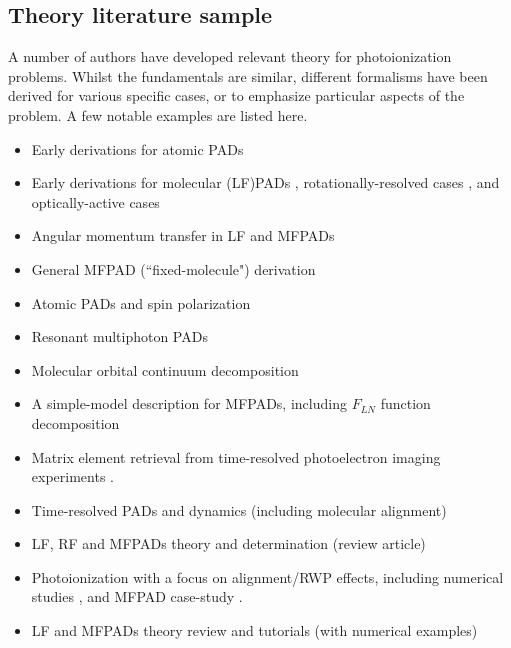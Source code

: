\subsection{Theory literature sample\label{sec:theory-lit}}

A number of authors have developed relevant theory for photoionization problems. Whilst the fundamentals are similar, different formalisms have been derived for various specific cases, or to emphasize particular aspects of the problem. A few notable examples are listed here.

\begin{itemize}
\item Early derivations for atomic PADs \cite{Cherepkov1979,Cooper1968,Cooper1969}
\item Early derivations for molecular (LF)PADs \cite{Tully1968}, rotationally-resolved cases \cite{Buckingham1970}, and optically-active cases \cite{Ritchie1976}
\item Angular momentum transfer in LF and MFPADs \cite{Fano1972} 
\item General MFPAD (``fixed-molecule") derivation \cite{Dill1976}
\item Atomic PADs and spin polarization \cite{Klar1982}
\item Resonant multiphoton PADs \cite{Dixit1983}
\item Molecular orbital continuum decomposition \cite{Park1996}
\item A simple-model description for MFPADs, including $F_{LN}$ function decomposition \cite{Lucchese2004}
\item Matrix element retrieval from time-resolved photoelectron imaging experiments \cite{Suzuki2007}.
\item Time-resolved PADs and dynamics (including molecular alignment) \cite{Underwood2000,Seideman2001,Stolow2008}
\item LF, RF and MFPADs theory and determination (review article) \cite{dowek2012PhotoionizationDynamicsPhotoemission}
\item Photoionization with a focus on alignment/RWP effects, including numerical studies \cite{Ramakrishna2012, Ramakrishna2013,hockett2015GeneralPhenomenologyIonization}, and MFPAD case-study \cite{reid2018AccessingMolecularFramea}.
\item LF and MFPADs theory review and tutorials (with numerical examples) \cite{hockett2018QMP1}
\end{itemize}